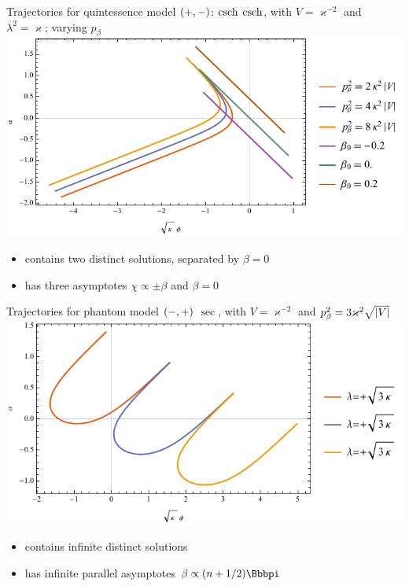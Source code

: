 \documentclass[8pt]{beamer}
\begin{document}
\begin{frame}%
{Trajectories for quintessence model ${\left(+,-\right)}$: $\operatorname{csch}$}%
{$\operatorname{csch}$, with $V = \varkappa^{-2}$ and
$\lambda^2 = \varkappa$; varying $p_\beta$}
\includegraphics[width=\textwidth]{../plots.nb/csch_pbet_l.pdf}
\begin{itemize}
	\item contains two distinct solutions, separated by $\beta = 0$
	\item has three asymptotes $\chi \propto \pm \beta$ and $\beta = 0$
\end{itemize}
\end{frame}

\begin{frame}%
{Trajectories for phantom model ${\left(-,+\right)}$}%
{$\sec$, with $V = \varkappa^{-2}$ and
$p_\beta^2 = 3\varkappa^2\sqrt{{\left|V\right|}}$}
\includegraphics[width=\textwidth]{../plots.nb/csc_lamb_l.pdf}
\begin{itemize}
	\item contains infinite distinct solutions
	\item has infinite parallel asymptotes $\beta \propto \rbr{n+1/2}\pp $
\end{itemize}
\end{frame}
\end{document}
